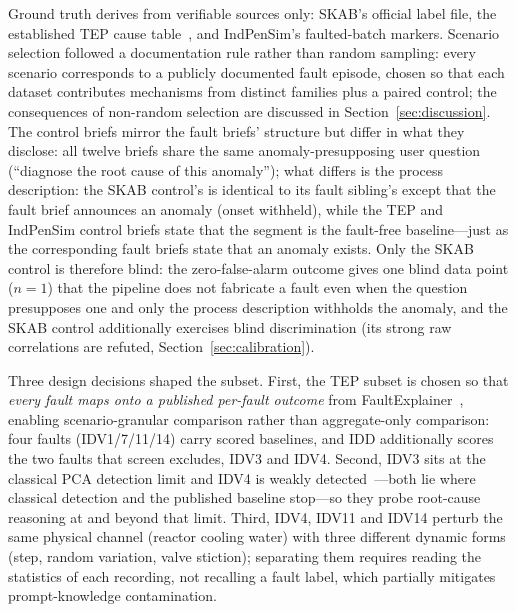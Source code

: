 \documentclass[preprint,12pt]{elsarticle}
\begin{document}
Ground truth derives from verifiable sources only: SKAB's official label file, the established TEP cause table~\cite{chiang2001fault}, and IndPenSim's faulted-batch markers. Scenario selection followed a documentation rule rather than random sampling: every scenario corresponds to a publicly documented fault episode, chosen so that each dataset contributes mechanisms from distinct families plus a paired control; the consequences of non-random selection are discussed in Section~\ref{sec:discussion}. 
The control briefs mirror the fault briefs' structure but differ in what they disclose: all twelve briefs share the same anomaly-presupposing user question (``diagnose the root cause of this anomaly''); what differs is the process description: the SKAB control's is identical to its fault sibling's except that the fault brief announces an anomaly (onset withheld), while the TEP and IndPenSim control briefs state that the segment is the fault-free baseline---just as the corresponding fault briefs state that an anomaly exists. Only the SKAB control is therefore blind: the zero-false-alarm outcome gives one blind data point ($n{=}1$) that the pipeline does not fabricate a fault even when the question presupposes one and only the process description withholds the anomaly, and the SKAB control additionally exercises blind discrimination (its strong raw correlations are refuted, Section~\ref{sec:calibration}).

Three design decisions shaped the subset. First, the TEP subset is chosen so that \emph{every fault maps onto a published per-fault outcome} from FaultExplainer~\cite{khan2024faultexplainer}, enabling scenario-granular comparison rather than aggregate-only comparison: four faults (IDV1/7/11/14) carry scored baselines, and IDD additionally scores the two faults that screen excludes, IDV3 and IDV4. Second, IDV3 sits at the classical PCA detection limit and IDV4 is weakly detected~\cite{russell2000delay,chiang2001fault}---both lie where classical detection and the published baseline stop---so they probe root-cause reasoning at and beyond that limit. Third, IDV4, IDV11 and IDV14 perturb the same physical channel (reactor cooling water) with three different dynamic forms (step, random variation, valve stiction); separating them requires reading the statistics of each recording, not recalling a fault label, which partially mitigates prompt-knowledge contamination.
\end{document}
